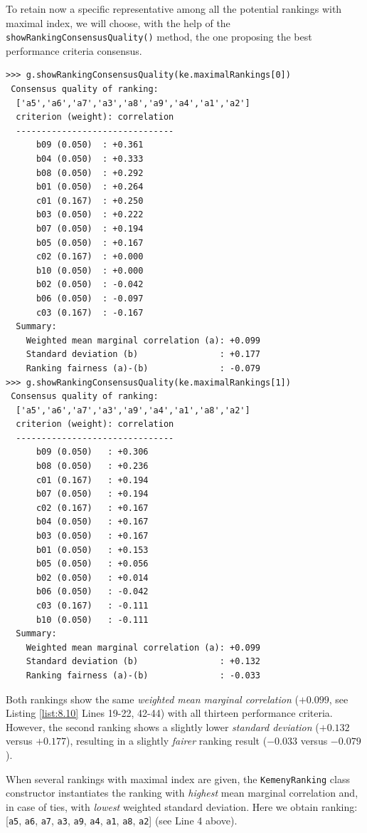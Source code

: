 To retain now a specific representative among all the potential rankings with maximal \Kemeny index, we will choose, with the help of the \\
\texttt{showRankingConsensusQuality()} method, the one proposing the best performance criteria consensus.
\begin{lstlisting}[caption={Computing the consensus quality of a ranking},label=list:8.10]   
>>> g.showRankingConsensusQuality(ke.maximalRankings[0])
 Consensus quality of ranking:
  ['a5','a6','a7','a3','a8','a9','a4','a1','a2']
  criterion (weight): correlation
  -------------------------------
      b09 (0.050)  : +0.361
      b04 (0.050)  : +0.333
      b08 (0.050)  : +0.292
      b01 (0.050)  : +0.264
      c01 (0.167)  : +0.250
      b03 (0.050)  : +0.222
      b07 (0.050)  : +0.194
      b05 (0.050)  : +0.167
      c02 (0.167)  : +0.000
      b10 (0.050)  : +0.000
      b02 (0.050)  : -0.042
      b06 (0.050)  : -0.097
      c03 (0.167)  : -0.167
  Summary:
    Weighted mean marginal correlation (a): +0.099
    Standard deviation (b)                : +0.177
    Ranking fairness (a)-(b)              : -0.079
>>> g.showRankingConsensusQuality(ke.maximalRankings[1])
 Consensus quality of ranking:
  ['a5','a6','a7','a3','a9','a4','a1','a8','a2']
  criterion (weight): correlation
  -------------------------------
      b09 (0.050)   : +0.306
      b08 (0.050)   : +0.236
      c01 (0.167)   : +0.194
      b07 (0.050)   : +0.194
      c02 (0.167)   : +0.167
      b04 (0.050)   : +0.167
      b03 (0.050)   : +0.167
      b01 (0.050)   : +0.153
      b05 (0.050)   : +0.056
      b02 (0.050)   : +0.014
      b06 (0.050)   : -0.042
      c03 (0.167)   : -0.111
      b10 (0.050)   : -0.111
  Summary:
    Weighted mean marginal correlation (a): +0.099
    Standard deviation (b)                : +0.132
    Ranking fairness (a)-(b)              : -0.033
\end{lstlisting}
Both \Kemeny rankings show the same \emph{weighted mean marginal correlation} ($+0.099$, see Listing \ref{list:8.10} Lines 19-22, 42-44) with all thirteen performance criteria. However, the second ranking shows a slightly lower \emph{standard deviation} ($+0.132$ versus $+0.177$), resulting in a slightly \emph{fairer} ranking result ($-0.033$ versus $-0.079$).

When several rankings with maximal \Kemeny index are given, the \texttt{KemenyRanking} class constructor instantiates the ranking with \emph{highest} mean marginal correlation and, in case of ties, with \emph{lowest} weighted standard deviation. Here we obtain ranking: [\texttt{a5}, \texttt{a6}, \texttt{a7}, \texttt{a3}, \texttt{a9}, \texttt{a4}, \texttt{a1}, \texttt{a8}, \texttt{a2}] (see Line 4 above).

